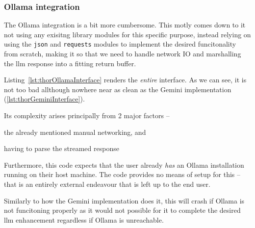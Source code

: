 \subsubsection{Ollama integration}

The Ollama integration is a bit more cumbersome. This motly comes down to it not
using any exisitng library modules for this specific purpose, instead relying on
using the \texttt{json} and \texttt{requests} modules to implement the desired
funcitonality from scratch, making it so that we need to handle network IO and
marshalling the \acrfull{llm} response into a fitting return buffer.

Listing~\ref{lst:thorOllamaInterface} renders the
\emph{entire} interface. As we can see, it is not too bad allthough nowhere near
as clean as the Gemini implementation (\ref{lst:thorGeminiInterface}).

Its complexity arises principally from \num{2} major factors --
\begin{inparaenum}
    \item the already mentioned manual networking, and
    \item having to parse the streamed response
\end{inparaenum}
Furthermore, this code expects that the user already \emph{has} an Ollama
installation running on their host machine. The code provides no means of setup
for this -- that is an entirely external endeavour that is left up to the end user.

Similarly to how the Gemini implementation does it, this will crash if Ollama is
not funcitoning properly as it would not possible for it to complete the desired
\acrshort{llm} enhancement regardless if Ollama is unreachable.

